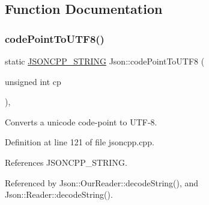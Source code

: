 \subsection{Function Documentation}
\mbox{\label{namespace_json_a33f8bda65a5b1fc4f5ddc39cb03dc742}} 
\subsubsection{\texorpdfstring{code\+Point\+To\+U\+T\+F8()}{codePointToUTF8()}}
{\footnotesize\ttfamily static \hyperlink{json_8h_a1e723f95759de062585bc4a8fd3fa4be}{J\+S\+O\+N\+C\+P\+P\+\_\+\+S\+T\+R\+I\+NG} Json\+::code\+Point\+To\+U\+T\+F8 (\begin{DoxyParamCaption}\item[{unsigned int}]{cp }\end{DoxyParamCaption})\hspace{0.3cm}{\ttfamily [inline]}, {\ttfamily [static]}}



Converts a unicode code-\/point to U\+T\+F-\/8. 



Definition at line 121 of file jsoncpp.\+cpp.



References J\+S\+O\+N\+C\+P\+P\+\_\+\+S\+T\+R\+I\+NG.



Referenced by Json\+::\+Our\+Reader\+::decode\+String(), and Json\+::\+Reader\+::decode\+String().


